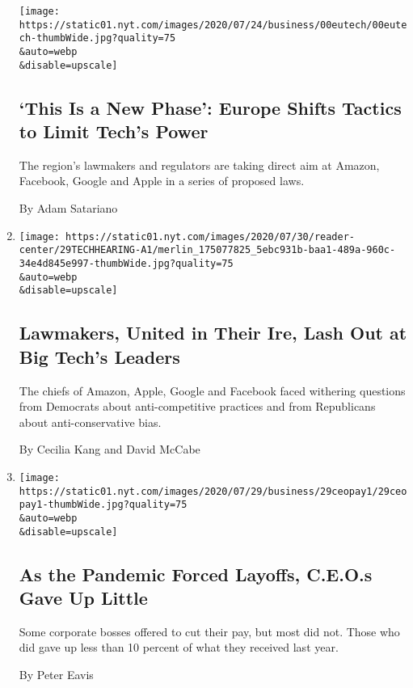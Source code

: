 \begin{enumerate}
  \texttt{[image: https://static01.nyt.com/images/2020/07/24/business/00eutech/00eutech-thumbWide.jpg?quality=75\\\&auto=webp\\\&disable=upscale]}

  \hypertarget{this-is-a-new-phase-europe-shifts-tactics-to-limit-techs-power}{%
  \subsection{`This Is a New Phase': Europe Shifts Tactics to Limit
  Tech's
  Power}\label{this-is-a-new-phase-europe-shifts-tactics-to-limit-techs-power}}

  The region's lawmakers and regulators are taking direct aim at Amazon,
  Facebook, Google and Apple in a series of proposed laws.

  By Adam Satariano
\item
  \href{/2020/07/29/technology/big-tech-hearing-apple-amazon-facebook-google.html}{}

  \texttt{[image: https://static01.nyt.com/images/2020/07/30/reader-center/29TECHHEARING-A1/merlin\_175077825\_5ebc931b-baa1-489a-960c-34e4d845e997-thumbWide.jpg?quality=75\\\&auto=webp\\\&disable=upscale]}

  \hypertarget{lawmakers-united-in-their-ire-lash-out-at-big-techs-leaders}{%
  \subsection{Lawmakers, United in Their Ire, Lash Out at Big Tech's
  Leaders}\label{lawmakers-united-in-their-ire-lash-out-at-big-techs-leaders}}

  The chiefs of Amazon, Apple, Google and Facebook faced withering
  questions from Democrats about anti-competitive practices and from
  Republicans about anti-conservative bias.

  By Cecilia Kang and David McCabe
\item
  \href{/2020/07/29/business/economy/ceo-pay-pandemic-layoffs.html}{}

  \texttt{[image: https://static01.nyt.com/images/2020/07/29/business/29ceopay1/29ceopay1-thumbWide.jpg?quality=75\\\&auto=webp\\\&disable=upscale]}

  \hypertarget{as-the-pandemic-forced-layoffs-ceos-gave-up-little}{%
  \subsection{As the Pandemic Forced Layoffs, C.E.O.s Gave Up
  Little}\label{as-the-pandemic-forced-layoffs-ceos-gave-up-little}}

  Some corporate bosses offered to cut their pay, but most did not.
  Those who did gave up less than 10 percent of what they received last
  year.

  By Peter Eavis
\end{enumerate}

